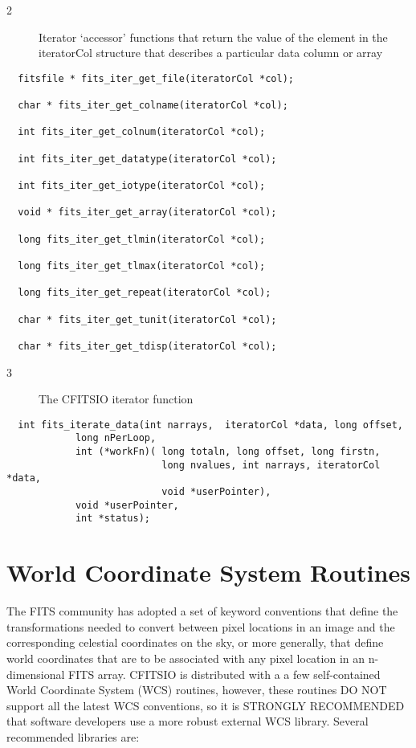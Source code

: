 \documentclass[11pt]{book}
\begin{document}
\begin{description}
\item[2 ]  Iterator `accessor' functions that return the value of the
     element in the iteratorCol structure
    that describes a particular data column or array \label{ffiterget}
\end{description}

\begin{verbatim}
  fitsfile * fits_iter_get_file(iteratorCol *col);

  char * fits_iter_get_colname(iteratorCol *col);

  int fits_iter_get_colnum(iteratorCol *col);

  int fits_iter_get_datatype(iteratorCol *col);

  int fits_iter_get_iotype(iteratorCol *col);

  void * fits_iter_get_array(iteratorCol *col);

  long fits_iter_get_tlmin(iteratorCol *col);

  long fits_iter_get_tlmax(iteratorCol *col);

  long fits_iter_get_repeat(iteratorCol *col);

  char * fits_iter_get_tunit(iteratorCol *col);

  char * fits_iter_get_tdisp(iteratorCol *col);
\end{verbatim}

\begin{description}
\item[3 ]  The CFITSIO iterator function \label{ffiter}
\end{description}

\begin{verbatim}
  int fits_iterate_data(int narrays,  iteratorCol *data, long offset,
            long nPerLoop,
            int (*workFn)( long totaln, long offset, long firstn,
                           long nvalues, int narrays, iteratorCol *data,
                           void *userPointer),
            void *userPointer,
            int *status);
\end{verbatim}

\chapter{ World Coordinate System Routines }

The FITS community has adopted a set of keyword conventions that define
the transformations needed to convert between pixel locations in an
image and the corresponding celestial coordinates on the sky, or more
generally, that define world coordinates that are to be associated with
any pixel location in an n-dimensional FITS array. CFITSIO is distributed
with a a few self-contained World Coordinate System (WCS) routines,
however, these routines DO NOT support all the latest WCS conventions,
so it is STRONGLY RECOMMENDED that software developers use a more robust
external WCS library.  Several recommended libraries are:
\end{document}

